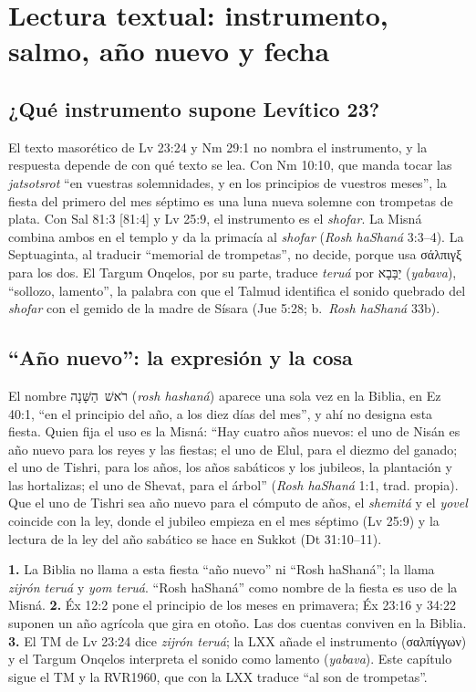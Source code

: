 \documentclass[11pt,letterpaper]{article}
\newcommand{\heb}[1]{\mbox{\foreignlanguage{hebrew}{#1}}}
\newcommand{\grc}[1]{\foreignlanguage{ancientgreek}{#1}}
\begin{document}
\section{Lectura textual: instrumento, salmo, año nuevo y fecha}

\subsection{¿Qué instrumento supone Levítico 23?}
El texto masorético de Lv 23:24 y Nm 29:1 no nombra el instrumento, y la respuesta depende de con qué texto se lea. Con Nm 10:10, que manda tocar las \emph{jatsotsrot} ``en vuestras solemnidades, y en los principios de vuestros meses'', la fiesta del primero del mes séptimo es una luna nueva solemne con trompetas de plata. Con Sal 81:3 [81:4] y Lv 25:9, el instrumento es el \emph{shofar}. La Misná combina ambos en el templo y da la primacía al \emph{shofar} (\emph{Rosh haShaná} 3:3--4). La Septuaginta, al traducir ``memorial de trompetas'', no decide, porque usa \grc{σάλπιγξ} para los dos. El Targum Onqelos, por su parte, traduce \emph{teruá} por \heb{יַבָּבָא} (\emph{yabava}), ``sollozo, lamento'', la palabra con que el Talmud identifica el sonido quebrado del \emph{shofar} con el gemido de la madre de Sísara (Jue 5:28; b.~\emph{Rosh haShaná} 33b).

\subsection{``Año nuevo'': la expresión y la cosa}
El nombre \heb{רֹאשׁ הַשָּׁנָה} (\emph{rosh hashaná}) aparece una sola vez en la Biblia, en Ez 40:1, ``en el principio del año, a los diez días del mes'', y ahí no designa esta fiesta. Quien fija el uso es la Misná: ``Hay cuatro años nuevos: el uno de Nisán es año nuevo para los reyes y las fiestas; el uno de Elul, para el diezmo del ganado; el uno de Tishri, para los años, los años sabáticos y los jubileos, la plantación y las hortalizas; el uno de Shevat, para el árbol'' (\emph{Rosh haShaná} 1:1, trad. propia). Que el uno de Tishri sea año nuevo para el cómputo de años, el \emph{shemitá} y el \emph{yovel} coincide con la ley, donde el jubileo empieza en el mes séptimo (Lv 25:9) y la lectura de la ley del año sabático se hace en Sukkot (Dt 31:10--11).

\begin{nota}
\textbf{1.} La Biblia no llama a esta fiesta ``año nuevo'' ni ``Rosh haShaná''; la llama \emph{zijrón teruá} y \emph{yom teruá}. ``Rosh haShaná'' como nombre de la fiesta es uso de la Misná. \textbf{2.} Éx 12:2 pone el principio de los meses en primavera; Éx 23:16 y 34:22 suponen un año agrícola que gira en otoño. Las dos cuentas conviven en la Biblia. \textbf{3.} El TM de Lv 23:24 dice \emph{zijrón teruá}; la LXX añade el instrumento (\grc{σαλπίγγων}) y el Targum Onqelos interpreta el sonido como lamento (\emph{yabava}). Este capítulo sigue el TM y la RVR1960, que con la LXX traduce ``al son de trompetas''.
\end{nota}
\end{document}
